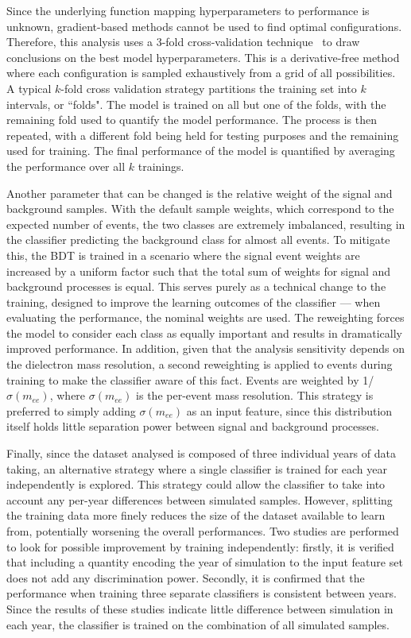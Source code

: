 Since the underlying function mapping hyperparameters to performance is unknown, gradient-based methods cannot be used to find optimal configurations. 
Therefore, this analysis uses a 3-fold cross-validation technique~\cite{patternRecognitionAndML} to draw conclusions on the best model hyperparameters. This is a derivative-free method where each configuration is sampled exhaustively from a grid of all possibilities. A typical $k$-fold cross validation strategy partitions the training set into $k$ intervals, or ``folds".
The model is trained on all but one of the folds, with the remaining fold used to quantify the model performance. The process is then repeated, with a different fold being held for testing purposes and the remaining used for training. The final performance of the model is quantified by averaging the performance over all $k$ trainings.

Another parameter that can be changed is the relative weight of the signal and background samples. With the default sample weights, which correspond to the expected number of events, the two classes are extremely imbalanced, resulting in the classifier predicting the background class for almost all events. To mitigate this, the BDT is trained in a scenario where the signal event weights are increased by a uniform factor such that the total sum of weights for signal and background processes is equal. This serves purely as a technical change to the training, designed to improve the learning outcomes of the classifier --- when evaluating the performance, the nominal weights are used. The reweighting forces the model to consider each class as equally important and results in dramatically improved performance. In addition, given that the analysis sensitivity depends on the dielectron mass resolution, a second reweighting is applied to \ggH events during training to make the classifier aware of this fact. Events are weighted by 1/$\sigma(m_{ee})$, where $\sigma(m_{ee})$ is the per-event mass resolution. This strategy is preferred to simply adding $\sigma(m_{ee})$ as an input feature, since this distribution itself holds little separation power between signal and background processes.

Finally, since the dataset analysed is composed of three individual years of data taking, an alternative strategy where a single classifier is trained for each year independently is explored. This strategy could allow the classifier to take into account any per-year differences between simulated samples. However, splitting the training data more finely reduces the size of the dataset available to learn from, potentially worsening the overall performances. Two studies are performed to look for possible improvement by training independently: firstly, it is verified that including a quantity encoding the year of simulation to the input feature set does not add any discrimination power. Secondly, it is confirmed that the performance when training three separate classifiers is consistent between years. Since the results of these studies indicate little difference between simulation in each year, the classifier is trained on the combination of all simulated samples.

